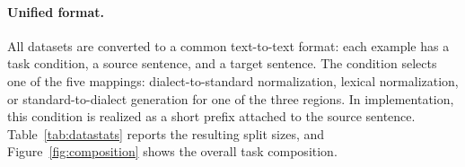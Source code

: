 \documentclass[11pt]{article}
\begin{document}


\paragraph{Unified format.}
All datasets are converted to a common text-to-text format: each example has a
task condition, a source sentence, and a target sentence. The condition selects
one of the five mappings: dialect-to-standard normalization, lexical
normalization, or standard-to-dialect generation for one of the three regions.
In implementation, this condition is realized as a short prefix attached to the
source sentence. Table~\ref{tab:datastats} reports the resulting split sizes, and
Figure~\ref{fig:composition} shows the overall task composition.
\end{document}
